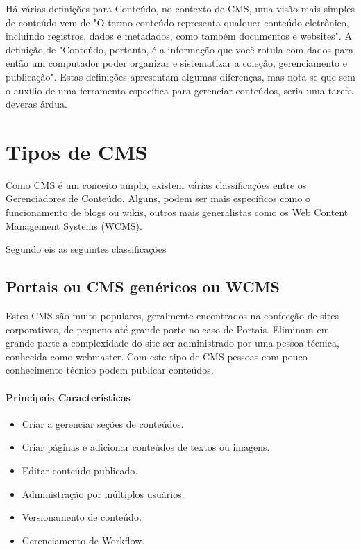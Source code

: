 Há várias definições para Conteúdo, no contexto de CMS, uma visão mais simples de conteúdo vem de \cite{ecm_paper} "O termo conteúdo representa qualquer conteúdo eletrônico, incluindo registros, dados e metadados, como também documentos e websites". 
A definição de \cite{cms_bible} "Conteúdo, portanto, é a informação que você rotula com dados para então um computador poder organizar e sistematizar a coleção, gerenciamento e publicação". Estas definições apresentam algumas diferenças, mas nota-se que sem o auxílio de uma ferramenta específica para gerenciar conteúdos, seria uma tarefa deveras árdua.

\section{Tipos de CMS}

Como CMS é um conceito amplo, existem várias classificações entre os Gerenciadores de Conteúdo. Alguns, podem ser mais específicos como o funcionamento de blogs ou wikis, outros mais generalistas como os Web Content Management Systems (WCMS).

Segundo \cite{choosing_open_source_cms} eis as seguintes classificações

\subsection{Portais ou CMS genéricos ou WCMS} 

Estes CMS são muito populares, geralmente encontrados na confecção de sites corporativos, de pequeno até grande porte no caso de Portais. Eliminam em grande parte a complexidade do site ser administrado por uma pessoa técnica, conhecida como webmaster. Com este tipo de CMS pessoas com pouco conhecimento técnico podem publicar conteúdos.

\paragraph{Principais Características}

\begin{itemize}
  \item Criar a gerenciar seções de conteúdos.
  \item Criar páginas e adicionar conteúdos de textos ou imagens.
  \item Editar conteúdo publicado.
  \item Administração por múltiplos usuários.
  \item Versionamento de conteúdo.
  \item Gerenciamento de Workflow.
\end{itemize}


